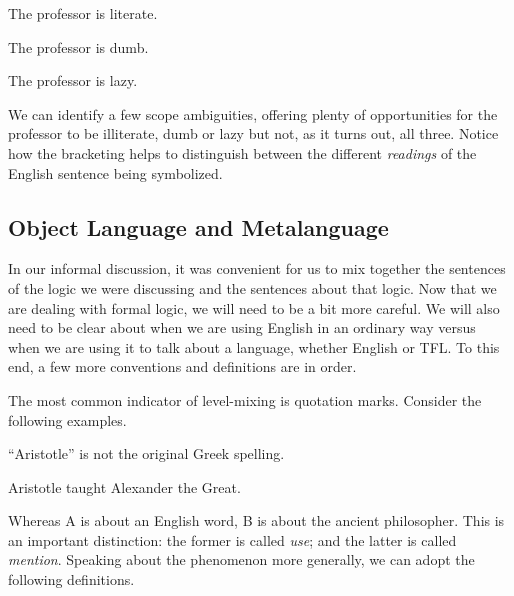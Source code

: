 \begin{grayarg}
\item[A:] The professor is literate.
\item[B:] The professor is dumb.
\item[C:] The professor is lazy.
\end{grayarg}

We can identify a few scope ambiguities, offering plenty of opportunities for
the professor to be illiterate, dumb or lazy but not, as it turns out, all
three. Notice how the bracketing helps to distinguish between the different
\emph{readings} of the English sentence being symbolized.



\subsection{Object Language and Metalanguage}

In our informal discussion, it was convenient for us to mix together the
sentences of the logic we were discussing and the sentences about that logic.
Now that we are dealing with formal logic, we will need to be a bit more
careful. We will also need to be clear about when we are using English in an
ordinary way versus when we are using it to talk about a language, whether
English or TFL. To this end, a few more conventions and definitions are in
order.

The most common indicator of level-mixing is quotation marks. Consider the
following examples.

\begin{argument}
\item[A:] ``Aristotle'' is not the original Greek spelling.  
\item[B:] Aristotle taught Alexander the Great.
\end{argument}

Whereas A is about an English word, B is about the ancient philosopher. This is
an important distinction: the former is called \emph{use}; and the latter is
called \emph{mention}. Speaking about the phenomenon more generally, we can
adopt the following definitions.

